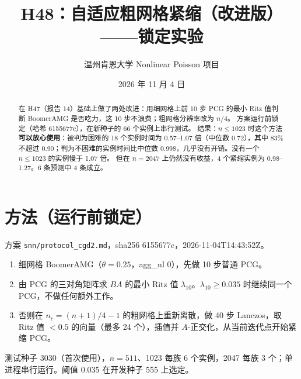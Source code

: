 \documentclass[11pt,a4paper]{ctexart}
\title{H48：自适应粗网格紧缩（改进版）——锁定实验}
\author{温州肯恩大学 \quad Nonlinear Poisson 项目}
\date{2026 年 11 月 4 日}
\begin{document}
\sloppy
\maketitle
\begin{abstract}
在 H47（报告 14）基础上做了两处改进：用细网格上前 10 步 PCG 的最小 Ritz 值判断 BoomerAMG 是否吃力，这 10 步不浪费；粗网格分辨率改为 $n/4$。
方案运行前锁定（哈希 6155677c），在新种子的 66 个实例上串行测试。
结果：$n\le1023$ 时这个方法\textbf{可以放心使用}：被判为困难的 18 个实例时间为 0.57--1.07 倍（中位数 0.72），其中 83\% 不超过 0.90；判为不困难的实例时间比中位数 0.998，几乎没有开销。没有一个 $n\le1023$ 的实例慢于 1.07 倍。
但在 $n=2047$ 上仍然没有收益，4 个紧缩实例为 0.98--1.27。6 条预测中 4 条成立。
\end{abstract}

\section{方法（运行前锁定）}
方案 \texttt{snn/protocol\_cgd2.md}，sha256 6155677c，2026-11-04T14:43:52Z。
\begin{enumerate}
\item 细网格 BoomerAMG（$\theta=0.25$，agg\_nl 0），先做 10 步普通 PCG。
\item 由 PCG 的三对角矩阵求 $BA$ 的最小 Ritz 值 $\lambda_{10}$。$\lambda_{10}\ge0.035$ 时继续同一个 PCG，不做任何额外工作。
\item 否则在 $n_c=(n+1)/4-1$ 的粗网格上重新离散，做 40 步 Lanczos，取 Ritz 值 $<0.5$ 的向量（最多 24 个），插值并 $A$-正交化，从当前迭代点开始紧缩 PCG。
\end{enumerate}
测试种子 3030（首次使用），$n=511$、1023 每族 6 个实例，2047 每族 3 个；单进程串行运行。阈值 0.035 在开发种子 555 上选定。
\end{document}
